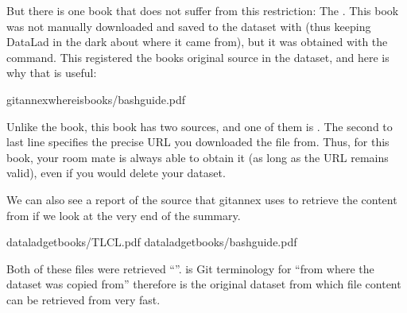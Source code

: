\sphinxAtStartPar
But there is one book that does not suffer from this restriction:
The .
This book was not manually downloaded and saved to the dataset with  (thus keeping DataLad in the dark about where it came from), but it was obtained with the  command.
This registered the books original source in the dataset, and here is why that is useful:

\begin{sphinxVerbatim}[commandchars=\\\{\}]
gitannexwhereisbooks/bash\PYGZus{}guide.pdf

\end{sphinxVerbatim}

\sphinxAtStartPar
Unlike the  book, this book has two sources, and one of them is .
The second to last line specifies the precise URL you downloaded the file from.
Thus, for this book, your room mate is always able to obtain it (as long as the URL remains valid), even if you would delete your  dataset.

\sphinxAtStartPar
We can also see a report of the source that git\sphinxhyphen{}annex uses to retrieve the content from if we look at the very end of the  summary.

\begin{sphinxVerbatim}[commandchars=\\\{\}]
dataladgetbooks/TLCL.pdf
dataladgetbooks/bash\PYGZus{}guide.pdf
\end{sphinxVerbatim}

\sphinxAtStartPar
Both of these files were retrieved “”.
 is Git terminology for “from where the dataset was copied from” \textendash{}  therefore is the original  dataset from which file content can be retrieved from very fast.

